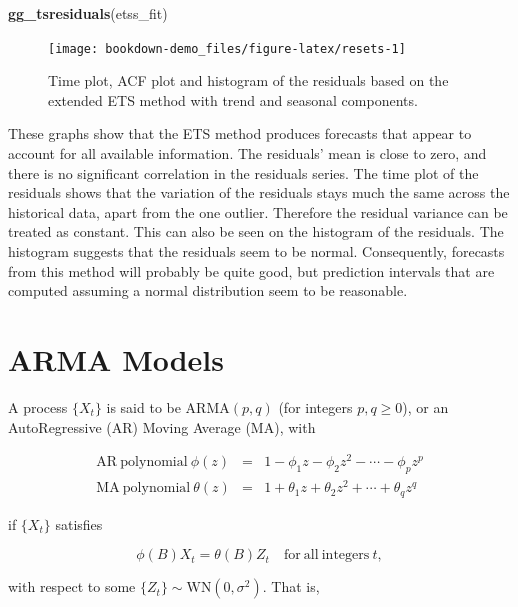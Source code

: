 \documentclass[]{book}
\newenvironment{Shaded}{\begin{snugshade}}{\end{snugshade}}
\newcommand{\KeywordTok}[1]{\textcolor[rgb]{0.13,0.29,0.53}{\textbf{#1}}}
\newcommand{\NormalTok}[1]{#1}
\begin{document}
\begin{Shaded}
\begin{Highlighting}[]
\KeywordTok{gg_tsresiduals}\NormalTok{(etss_fit)}
\end{Highlighting}
\end{Shaded}

\begin{figure}

{\centering \texttt{[image: bookdown-demo\_files/figure-latex/resets-1]} 

}

\caption{Time plot, ACF plot and histogram of the residuals based on the extended ETS method with trend and seasonal components.}\label{fig:resets}
\end{figure}

These graphs show that the ETS method produces forecasts that appear to
account for all available information. The residuals' mean is close to
zero, and there is no significant correlation in the residuals series.
The time plot of the residuals shows that the variation of the residuals
stays much the same across the historical data, apart from the one
outlier. Therefore the residual variance can be treated as constant.
This can also be seen on the histogram of the residuals. The histogram
suggests that the residuals seem to be normal. Consequently, forecasts
from this method will probably be quite good, but prediction intervals
that are computed assuming a normal distribution seem to be reasonable.

\section{ARMA Models}\label{arma-models}

A process \(\{X_t\}\) is said to be ARMA\((p,q)\) (for integers
\(p,q \geq 0\)), or an AutoRegressive (AR) Moving Average (MA), with

\begin{eqnarray*}
\mathrm{AR~polynomial~} \phi(z) &=& 1 -\phi_1 z -\phi_2 z^2 - \cdots -\phi_p z^p \\
\mathrm{MA~polynomial~} \theta(z) &=& 1 + \theta_1 z +\theta_2 z^2 + \cdots +\theta_q z^q
\end{eqnarray*}

if \(\{X_t\}\) satisfies

\[
\phi(B)X_t = \theta(B)Z_t \quad \mathrm{for~all~integers~} t,
\]

with respect to some \(\{Z_t\}\sim \mathrm{WN}(0,\sigma^2)\). That is,
\end{document}
